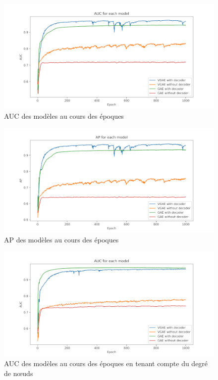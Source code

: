 \documentclass{article}
\begin{document}
\begin{figure}[H]
    \centering
    \includegraphics[width=1\linewidth]{../test_performance/sans_degre_0dropout/AUC.png}
    \caption{AUC des modèles au cours des époques}
    \label{fig:fig_AUC}
\end{figure}

\begin{figure}[H]
    \centering
    \includegraphics[width=1\linewidth]{../test_performance/sans_degre_0dropout/AP.png}
    \caption{AP des modèles au cours des époques}
    \label{fig:fig_AP}
\end{figure}

\begin{figure}[H]
    \centering
    \includegraphics[width=1\linewidth]{../test_performance/avec_degre_0dropout/AUC.png}
    \caption{AUC des modèles au cours des époques en tenant compte du degré de nœuds}
    \label{fig:fig_AUC_avec_degre}
\end{figure}
\end{document}
